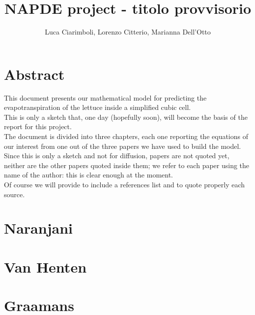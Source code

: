 \documentclass[10pt,a4paper]{book}
\author{Luca Ciarimboli, Lorenzo Citterio, Marianna Dell'Otto}
\title{NAPDE project - titolo provvisorio}
\begin{document}
	\begin{titlepage}
		\maketitle
	\end{titlepage}
	
	\frontmatter
	\chapter*{Abstract}
	This document presents our mathematical model for predicting the evapotranspiration of the lettuce inside a simplified cubic cell.\\
	This is only a sketch that, one day (hopefully soon), will become the basis of the report for this project.\\
	The document is divided into three chapters, each one reporting the equations of our interest from one out of the three papers we have used to build the model.\\
	Since this is only a sketch and not for diffusion, papers are not quoted yet, neither are the other papers quoted inside them; we refer to each paper using the name of the author: this is clear enough at the moment.\\
	Of course we will provide to include a references list and to quote properly each source.\\
	\tableofcontents
	
	\mainmatter
	\chapter{Naranjani}
	
	\chapter{Van Henten}
	
	\chapter{Graamans}
	
	
	\backmatter
	
\end{document}
